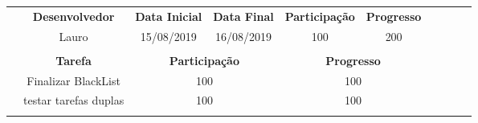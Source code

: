 \documentclass[ a4paper, landscape]{article}
\begin{document}
\begin{longtable}{p{0.1cm}c|c|c|c|c|c|c|cp{0.1cm}}
      &\multicolumn{1}{|c|}{\textbf{\textcolor{CDes}{Desenvolvedor}}} 
      &\textbf{\textcolor{CDes}{Data Inicial}} 
      &\textbf{\textcolor{CDes}{Data Final}} 
      &\textbf{\textcolor{CDes}{Participação}} 
      &\multicolumn{1}{c|}{\textbf{\textcolor{CDes}{Progresso}}} \\ [1ex] \cline{2-6} 
      &\multicolumn{1}{|c|}{\textcolor{CDes}{Lauro}}
      &\textcolor{CDes}{15/08/2019}
      &\textcolor{CDes}{16/08/2019}
      &\textcolor{CDes}{100}
      &\multicolumn{1}{c|}{\textcolor{CDes}{200}}\\ [1ex] 
      \cline{2-6}\\ 
      \arrayrulecolor{Tar} 
     \cline{2-6} 
      &\multicolumn{1}{c||}{\textbf{\textcolor{Tar}{Tarefa}}} 
      &\multicolumn{2}{c|}{\textbf{\textcolor{Tar}{Participação}}} 
      &\multicolumn{2}{c}{\textbf{\textcolor{Tar}{Progresso}}} \\ [1ex] \cline{2-6} 
      &\multicolumn{1}{c||}{\textcolor{Tar}{Finalizar BlackList}}
      &\multicolumn{2}{c|}{\textcolor{Tar}{100}}
      &\multicolumn{2}{c}{\textcolor{Tar}{100}}\\ 
\cline{2-6} 
      &\multicolumn{1}{c||}{\textcolor{Tar}{testar tarefas duplas}}
      &\multicolumn{2}{c|}{\textcolor{Tar}{100}}
      &\multicolumn{2}{c}{\textcolor{Tar}{100}}\\ 
\cline{2-6} 
      \newpage 
\hline \hline
\bottomrule\\ 
\end{longtable}
\end{document}
